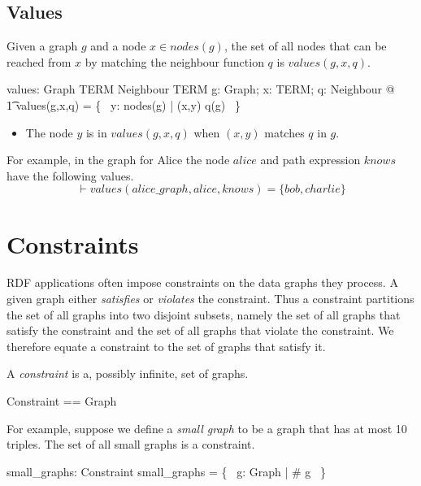 \documentclass{article}
\begin{document}
\subsection{Values}

Given a graph $g$ and a node $x \in nodes(g)$, the set of all nodes that can be reached from $x$ by matching the neighbour function $q$  is $values(g,x,q)$.
\begin{axdef}
values: Graph \cross TERM \cross Neighbour \fun \finset TERM
\where
\forall g: Graph; x: TERM; q: Neighbour @ \\
\t1	values(g,x,q) = \{~ y: nodes(g) | (x,y) \in q(g) ~\}
\end{axdef}
\begin{itemize}
\item The node $y$ is in $values(g,x,q)$ when $(x,y)$ matches $q$ in $g$.
\end{itemize}

For example, in the graph for Alice the node $alice$ and path expression $knows$ have the following values.
\[\vdash 
	values(alice\_graph, alice, knows) = \{bob, charlie\}
\]

\section{Constraints}
\label{sec-constraints}

RDF applications often impose constraints on the data graphs they process.
A given graph either {\em satisfies} or {\em violates} the constraint.
Thus a constraint partitions the set of all graphs into two disjoint subsets,
namely the set of all graphs that satisfy the constraint and the set of all graphs that violate the constraint.
We therefore equate a constraint to the set of graphs that satisfy it.

A {\em constraint} is a, possibly infinite, set of graphs. 
\begin{zed}
	Constraint == \power Graph
\end{zed}

For example, suppose we define a {\em small graph} to be a graph that has at most 10 triples.
The set of all small graphs is a constraint.
\begin{axdef}
	small\_graphs: Constraint
\where
	small\_graphs = \{~ g: Graph | \# g  ~\}
\end{axdef}
\end{document}
